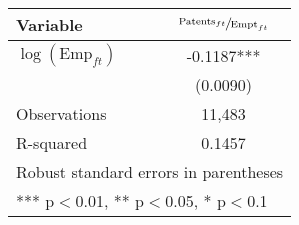 \small{
\begin{tabular}{lc} \hline\hline
Variable & $\sfrac{\text{Patents}_{ft}}{\text{Empt}_{ft}}$ \\ \hline
$\log\left(\text{Emp}_{ft}\right)$ & -0.1187*** \\
 & (0.0090) \\
\hline
Observations & 11,483 \\
 R-squared & 0.1457 \\ \hline\hline
\multicolumn{2}{l}{ Robust standard errors in parentheses} \\
\multicolumn{2}{l}{ *** p$<$0.01, ** p$<$0.05, * p$<$0.1} \\
\end{tabular}
}